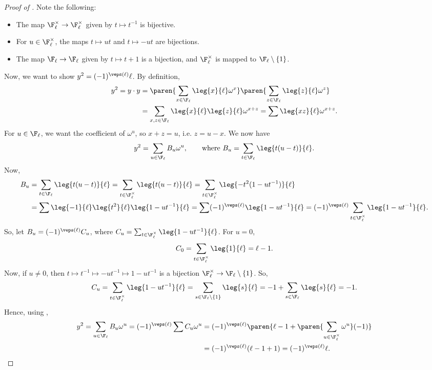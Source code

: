 \begin{proof}[Proof of ]
    Note the following:
    \begin{itemize}
        \item The map $\F_\ell^\times \to \F_\ell^\times$ given by $t \mapsto t^{-1}$ is bijective.
        \item For $u \in \F_\ell^\times$, the maps $t \mapsto ut$ and $t \mapsto -ut$ are bijections.
        \item The map $\F_\ell \to \F_\ell$ given by $t \mapsto t + 1$ is a bijection, and $\F_\ell^\times$ is mapped to $\F_\ell \setminus \{1\}$.
    \end{itemize}
    Now, we want to show $y^2 = (-1)^{\veps(\ell)}\ell$. By definition,
    \begin{align*}
        y^2 = y \cdot y &= \paren{\sum_{x \in \F_\ell} \leg{x}{\ell} \omega^x}\paren{\sum_{z \in \F_\ell} \leg{z}{\ell} \omega^z} \\
        &= \sum_{x,z \in \F_\ell} \leg{x}{\ell}\leg{z}{\ell} \omega^{x+z} = \sum \leg{xz}{\ell} \omega^{x+z}.
    \end{align*}
    For $u \in \F_\ell$, we want the coefficient of $\omega^u$, so $x + z = u$, i.e. $z = u - x$. We now have
    $$y^2 = \sum_{u \in \F_\ell} B_u \omega^u, \qquad \text{where } B_u = \sum_{t \in \F_\ell} \leg{t(u-t)}{\ell}.$$
    Now,
    \begin{align*}
        B_u &= \sum_{t \in \F_\ell} \leg{t(u-t)}{\ell} = \sum_{t \in \F_\ell^\times} \leg{t(u-t)}{\ell} = \sum_{t \in \F_\ell^\times} \leg{-t^2(1-ut^{-1})}{\ell} \\
        &= \sum \leg{-1}{\ell}\leg{t^2}{\ell}\leg{1-ut^{-1}}{\ell} = \sum (-1)^{\veps(\ell)} \leg{1-ut^{-1}}{\ell} = (-1)^{\veps(\ell)} \sum_{t \in \F_\ell^\times} \leg{1-ut^{-1}}{\ell}.
    \end{align*}
    So, let $B_u = (-1)^{\veps(\ell)} C_u$, where $C_u = \sum_{t \in \F_\ell^\times} \leg{1-ut^{-1}}{\ell}$. For $u = 0$,
    $$C_0 = \sum_{t \in \F_\ell^\times} \leg{1}{\ell} = \ell - 1.$$
    Now, if $u \neq 0$, then $t \mapsto t^{-1} \mapsto -ut^{-1} \mapsto 1 - ut^{-1}$ is a bijection $\F_\ell^\times \to \F_\ell \setminus \{1\}$. So,
    $$C_u = \sum_{t \in \F_\ell^\times} \leg{1-ut^{-1}}{\ell} = \sum_{s \in \F_\ell \setminus \{1\}} \leg{s}{\ell} = -1 + \sum_{s \in \F_\ell} \leg{s}{\ell} = -1.$$
    Hence, using ,
    \begin{align*}
        y^2 = \sum_{u \in \F_\ell} B_u \omega^u = (-1)^{\veps(\ell)} \sum C_u \omega^u &= (-1)^{\veps(\ell)} \paren{\ell - 1 + \paren{\sum_{u \in \F_\ell^\times} \omega^u}(-1)} \\
        &= (-1)^{\veps(\ell)}(\ell - 1 + 1) = (-1)^{\veps(\ell)}\ell.
    \end{align*}
\end{proof}
